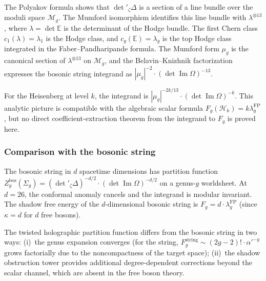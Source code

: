 \begin{remark}
\label{rem:thqg-I-mumford-form}
The Polyakov formula shows that $\det{}'_\zeta\Delta$ is a section of a line bundle over the moduli space $\mathcal{M}_g$. The Mumford isomorphism identifies this line bundle with $\lambda^{\otimes 13}$, where $\lambda = \det\mathbb{E}$ is the determinant of the Hodge bundle. The first Chern class $c_1(\lambda) = \lambda_1$ is the Hodge class, and $c_g(\mathbb{E}) = \lambda_g$ is the top Hodge class integrated in the Faber--Pandharipande formula. The Mumford form $\mu_g$ is the canonical section of $\lambda^{\otimes 13}$ on $\mathcal{M}_g$, and the Belavin--Knizhnik factorization expresses the bosonic string integrand as $|\mu_g|^{-2} \cdot (\det\operatorname{Im}\Omega)^{-13}$.

For the Heisenberg at level $k$, the integrand is
$|\mu_g|^{-2k/13} \cdot (\det\operatorname{Im}\Omega)^{-k}$. This
analytic picture is compatible with the algebraic scalar formula
$F_g(\mathcal{H}_k)=k\lambda_g^{\mathrm{FP}}$, but no direct
coefficient-extraction theorem from the integrand to $F_g$ is proved
here.
\end{remark}

\subsubsection{Comparison with the bosonic string}

\begin{remark}[Bosonic string at $d = 26$]
\label{rem:thqg-I-bosonic-string}
The bosonic string in $d$ spacetime dimensions has partition function $Z_g^{\mathrm{bos}}(\Sigma_g) = (\det{}'_\zeta\Delta)^{-d/2} \cdot (\det\operatorname{Im}\Omega)^{-d/2}$ on a genus-$g$ worldsheet. At $d = 26$, the conformal anomaly cancels and the integrand is modular invariant. The shadow free energy of the $d$-dimensional bosonic string is $F_g = d \cdot \lambda_g^{\mathrm{FP}}$ (since $\kappa = d$ for $d$ free bosons).

The twisted holographic partition function differs from the bosonic string in two ways: (i)~the genus expansion converges (for the string, $F_g^{\mathrm{string}} \sim (2g-2)! \cdot \alpha'^{-g}$ grows factorially due to the noncompactness of the target space); (ii)~the shadow obstruction tower provides additional degree-dependent corrections beyond the scalar channel, which are absent in the free boson theory.
\end{remark}

